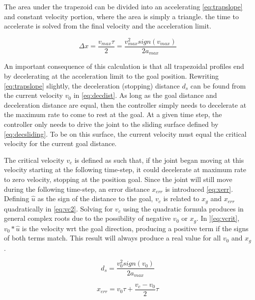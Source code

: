 The area under the trapezoid can be divided into an accelerating
\eqref{eq:trapslope} and constant velocity portion, where the area is simply a
triangle. the time to accelerate is solved from the final velocity and the
acceleration limit.

\begin{equation}
\label{eq:trapslope}
\Delta x=\frac{v_{max}\tau}{2}=\frac{v_{max}^2 sign(v_{max})}{2a_{max}}
\end{equation}

An important consequence of this calculation is that all trapezoidal profiles
end by decelerating at the acceleration limit to the goal position. Rewriting
\eqref{eq:trapslope} slightly, the deceleration (stopping) distance $d_s$ can be found
from the current velocity $v_0$ in \eqref{eq:decdist}. As long as the goal
distance and deceleration distance are equal, then the controller simply
needs to decelerate at the maximum rate to come to rest at the goal. At a given
time step, the controller only needs to drive the joint to the sliding surface
defined by \eqref{eq:decsliding}. To be on this surface, the current velocity
must equal the critical velocity for the current goal distance.

The critical velocity $v_c$ is defined as such that, if the joint began moving at
this velocity starting at the following time-step, it could decelerate at
maximum rate to zero velocity, stopping at the position goal. Since the joint
will still move during the following time-step, an error distance $x_{err}$ is
introduced \eqref{eq:xerr}.  Defining $\hat{u}$ as the sign of the distance to
the goal, $v_c$ is related to $x_g$ and $x_{err}$ quadratically in
\eqref{eq:vc2}.  Solving for $v_c$ using the quadratic formula produces in
general complex roots due to the possibility of negative $v_0$ or $x_g$.  In
]\eqref{eq:vcrit}, $v_0*\hat{u}$ is the velocity wrt the goal direction,
producing a positive term if the signs of both terms match. This result will
always produce a real value for all $v_0$ and $x_g$.

\begin{equation}
\label{eq:decdist}
d_s=\frac{v_0^2 sign(v_0)}{2 a_{max}}
\end{equation}

\begin{equation}
\label{eq:xerr}
x_{err}=v_0 \tau + \frac{v_c-v_0}{2}\tau
\end{equation}

